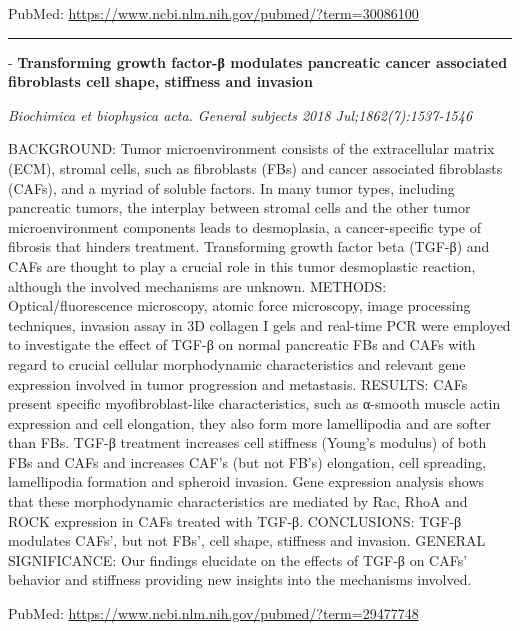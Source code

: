 \documentclass[]{article}
\begin{document}
PubMed: \url{https://www.ncbi.nlm.nih.gov/pubmed/?term=30086100}

{}

{}

\begin{center}\rule{0.5\linewidth}{\linethickness}\end{center}

 - \textbf{Transforming growth factor-β modulates pancreatic cancer
associated fibroblasts cell shape, stiffness and invasion}

\emph{Biochimica et biophysica acta. General subjects 2018
Jul;1862(7):1537-1546}

BACKGROUND: Tumor microenvironment consists of the extracellular matrix
(ECM), stromal cells, such as fibroblasts (FBs) and cancer associated
fibroblasts (CAFs), and a myriad of soluble factors. In many tumor
types, including pancreatic tumors, the interplay between stromal cells
and the other tumor microenvironment components leads to desmoplasia, a
cancer-specific type of fibrosis that hinders treatment. Transforming
growth factor beta (TGF-β) and CAFs are thought to play a crucial role
in this tumor desmoplastic reaction, although the involved mechanisms
are unknown. METHODS: Optical/fluorescence microscopy, atomic force
microscopy, image processing techniques, invasion assay in 3D collagen I
gels and real-time PCR were employed to investigate the effect of TGF-β
on normal pancreatic FBs and CAFs with regard to crucial cellular
morphodynamic characteristics and relevant gene expression involved in
tumor progression and metastasis. RESULTS: CAFs present specific
myofibroblast-like characteristics, such as α-smooth muscle actin
expression and cell elongation, they also form more lamellipodia and are
softer than FBs. TGF-β treatment increases cell stiffness (Young's
modulus) of both FBs and CAFs and increases CAF's (but not FB's)
elongation, cell spreading, lamellipodia formation and spheroid
invasion. Gene expression analysis shows that these morphodynamic
characteristics are mediated by Rac, RhoA and ROCK expression in CAFs
treated with TGF-β. CONCLUSIONS: TGF-β modulates CAFs', but not FBs',
cell shape, stiffness and invasion. GENERAL SIGNIFICANCE: Our findings
elucidate on the effects of TGF-β on CAFs' behavior and stiffness
providing new insights into the mechanisms involved.

PubMed: \url{https://www.ncbi.nlm.nih.gov/pubmed/?term=29477748}

{}

{}
\end{document}

